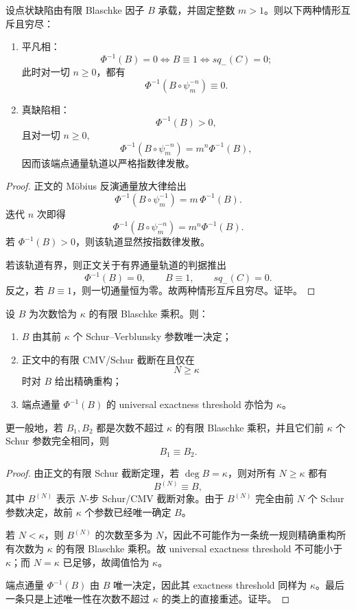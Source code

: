 \begin{theorem}[端点通量轨道的指数逃逸二歧律]\label{thm:conclusion-visible-endpoint-flux-exponential-dichotomy}
设点状缺陷由有限 Blaschke 因子 \(B\) 承载，并固定整数 \(m>1\)。则以下两种情形互斥且穷尽：
\begin{enumerate}
  \item 平凡相：
  \[
  \Phi^{-1}(B)=0
  \iff
  B\equiv 1
  \iff
  sq_-(C)=0;
  \]
  此时对一切 \(n\ge 0\)，都有
  \[
  \Phi^{-1}(B\circ \psi_m^{-n})\equiv 0.
  \]
  \item 真缺陷相：
  \[
  \Phi^{-1}(B)>0,
  \]
  且对一切 \(n\ge 0\),
  \[
  \Phi^{-1}(B\circ\psi_m^{-n})
  =
  m^n\Phi^{-1}(B),
  \]
  因而该端点通量轨道以严格指数律发散。
\end{enumerate}
\end{theorem}
\begin{proof}
正文的 Möbius 反演通量放大律给出
\[
\Phi^{-1}(B\circ\psi_m^{-1})=m\,\Phi^{-1}(B).
\]
迭代 \(n\) 次即得
\[
\Phi^{-1}(B\circ\psi_m^{-n})=m^n\Phi^{-1}(B).
\]
若 \(\Phi^{-1}(B)>0\)，则该轨道显然按指数律发散。

若该轨道有界，则正文关于有界通量轨道的判据推出
\[
\Phi^{-1}(B)=0,\qquad B\equiv 1,\qquad sq_-(C)=0.
\]
反之，若 \(B\equiv 1\)，则一切通量恒为零。故两种情形互斥且穷尽。证毕。
\end{proof}

\begin{theorem}\label{thm:conclusion-visible-degree-kappa-schur-jet-rigidity}
设 \(B\) 为次数恰为 \(\kappa\) 的有限 Blaschke 乘积。则：
\begin{enumerate}
  \item \(B\) 由其前 \(\kappa\) 个 Schur--Verblunsky 参数唯一决定；
  \item 正文中的有限 CMV/Schur 截断在且仅在
  \[
  N\ge \kappa
  \]
  时对 \(B\) 给出精确重构；
  \item 端点通量 \(\Phi^{-1}(B)\) 的 universal exactness threshold 亦恰为 \(\kappa\)。
\end{enumerate}
更一般地，若 \(B_1,B_2\) 都是次数不超过 \(\kappa\) 的有限 Blaschke 乘积，并且它们前 \(\kappa\) 个 Schur 参数完全相同，则
\[
B_1\equiv B_2.
\]
\end{theorem}
\begin{proof}
由正文的有限 Schur 截断定理，若 \(\deg B=\kappa\)，则对所有 \(N\ge \kappa\) 都有
\[
B^{(N)}\equiv B,
\]
其中 \(B^{(N)}\) 表示 \(N\)-步 Schur/CMV 截断对象。由于 \(B^{(N)}\) 完全由前 \(N\) 个 Schur 参数决定，故前 \(\kappa\) 个参数已经唯一确定 \(B\)。

若 \(N<\kappa\)，则 \(B^{(N)}\) 的次数至多为 \(N\)，因此不可能作为一条统一规则精确重构所有次数为 \(\kappa\) 的有限 Blaschke 乘积。故 universal exactness threshold 不可能小于 \(\kappa\)；而 \(N=\kappa\) 已足够，故阈值恰为 \(\kappa\)。

端点通量 \(\Phi^{-1}(B)\) 由 \(B\) 唯一决定，因此其 exactness threshold 同样为 \(\kappa\)。最后一条只是上述唯一性在次数不超过 \(\kappa\) 的类上的直接重述。证毕。
\end{proof}

